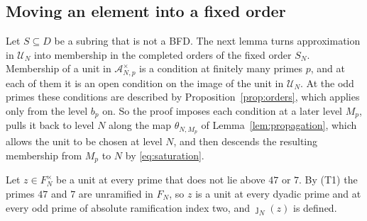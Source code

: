 \documentclass[11pt]{article}
\theoremstyle{plain}
\theoremstyle{definition}
\theoremstyle{remark}
\begin{document}
\subsection{Moving an element into a fixed order}\label{sec:joint-return}

Let $S\subseteq D$ be a subring that is not a BFD.  The next lemma turns
approximation in $\mathcal U_N$ into membership in the completed orders of
the fixed order $S_N$.  Membership of a unit in $\mathcal A_{N,p}^\times$
is a condition at finitely many primes $p$, and at each of them it is an
open condition on the image of the unit in $\mathcal U_N$.  At the odd
primes these conditions are described by
Proposition~\ref{prop:orders}, which applies only from the level $b_p$ on.
So the proof imposes each condition at a later level $M_p$, pulls it
back to level $N$ along the map $\theta_{N,M_p}$ of
Lemma~\ref{lem:propagation}, which allows the unit to be chosen at level
$N$, and then descends the resulting membership from $M_p$ to $N$ by
\eqref{eq:saturation}.

Let $z\in F_N^\times$ be a unit at every prime that does not lie above
$47$ or $7$.  By (T1) the primes $47$ and $7$ are unramified in $F_N$, so
$z$ is a unit at every dyadic prime and at every odd prime of absolute
ramification index two, and $\jmath_N(z)$ is defined.
\end{document}
